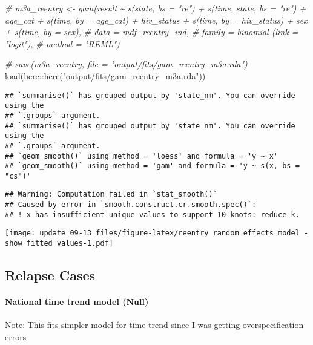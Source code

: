 \documentclass[
]{article}
\newenvironment{Shaded}{\begin{snugshade}}{\end{snugshade}}
\newcommand{\CommentTok}[1]{\textcolor[rgb]{0.56,0.35,0.01}{\textit{#1}}}
\newcommand{\FunctionTok}[1]{\textcolor[rgb]{0.00,0.00,0.00}{#1}}
\newcommand{\NormalTok}[1]{#1}
\newcommand{\SpecialCharTok}[1]{\textcolor[rgb]{0.00,0.00,0.00}{#1}}
\newcommand{\StringTok}[1]{\textcolor[rgb]{0.31,0.60,0.02}{#1}}
\begin{document}
\begin{Shaded}
\begin{Highlighting}[]
\CommentTok{\# m3a\_reentry \textless{}{-} gam(result \textasciitilde{} s(state, bs = "re") + s(time, state, bs = "re") + age\_cat + s(time, by = age\_cat) + hiv\_status + s(time, by = hiv\_status) + sex + s(time, by = sex), }
\CommentTok{\#           data = mdf\_reentry\_ind, }
\CommentTok{\#           family = binomial (link = "logit"), }
\CommentTok{\#           method = "REML")}

\CommentTok{\# save(m3a\_reentry, file = "output/fits/gam\_reentry\_m3a.rda")}
\FunctionTok{load}\NormalTok{(here}\SpecialCharTok{::}\FunctionTok{here}\NormalTok{(}\StringTok{"output/fits/gam\_reentry\_m3a.rda"}\NormalTok{))}
\end{Highlighting}
\end{Shaded}

\begin{verbatim}
## `summarise()` has grouped output by 'state_nm'. You can override using the
## `.groups` argument.
## `summarise()` has grouped output by 'state_nm'. You can override using the
## `.groups` argument.
## `geom_smooth()` using method = 'loess' and formula = 'y ~ x'
## `geom_smooth()` using method = 'gam' and formula = 'y ~ s(x, bs = "cs")'
\end{verbatim}

\begin{verbatim}
## Warning: Computation failed in `stat_smooth()`
## Caused by error in `smooth.construct.cr.smooth.spec()`:
## ! x has insufficient unique values to support 10 knots: reduce k.
\end{verbatim}

\texttt{[image: update\_09-13\_files/figure-latex/reentry random effects model - show fitted values-1.pdf]}

\newpage

\hypertarget{relapse-cases}{%
\subsection{Relapse Cases}\label{relapse-cases}}

\hypertarget{national-time-trend-model-null}{%
\paragraph{National time trend model
(Null)}\label{national-time-trend-model-null}}

Note: This fits simpler model for time trend since I was getting
overspecification errors
\end{document}
